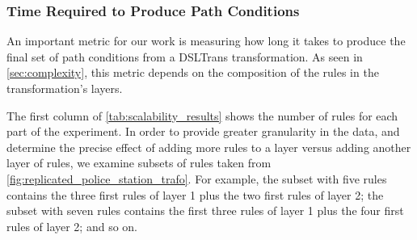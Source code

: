 \subsubsection{Time Required to Produce Path Conditions}

An important metric for our work is measuring how long it takes to produce the final set of path conditions from a DSLTrans transformation. As seen in \cref{sec:complexity}, this metric depends on the composition of the rules in the transformation's layers.

The first column of \cref{tab:scalability_results} shows the number of
rules for each part of the experiment. In order to provide greater granularity in the data, and determine the precise effect of adding more rules to a layer versus adding another layer of rules, we examine subsets of rules taken from \cref{fig:replicated_police_station_trafo}. For example, the subset with five rules contains the three first rules of layer 1 plus the two first rules of layer 2; the subset with seven rules contains the first three rules of layer 1 plus the four first rules of layer 2; and so on.

%



